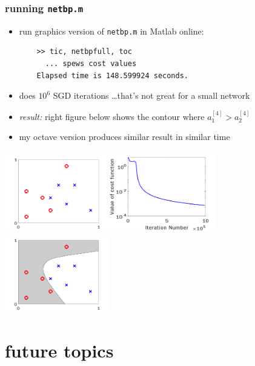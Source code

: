 \documentclass[xcolor={svgnames},
               hyperref={colorlinks,citecolor=DeepPink4,linkcolor=FireBrick,urlcolor=Maroon}]
               {beamer}
\begin{document}
\begin{frame}[fragile]
\frametitle{running \texttt{netbp.m}}

\begin{itemize}
\item run graphics version of \texttt{netbp.m} in Matlab online:

\begin{Verbatim}
    >> tic, netbpfull, toc
      ... spews cost values
    Elapsed time is 148.599924 seconds.
\end{Verbatim}

\item does $10^6$ SGD iterations \dots that's not great for a small network
\item \emph{result:} right figure below shows the contour where $a_1^{[4]} > a_2^{[4]}$
\item my octave version produces similar result in similar time
\end{itemize}

\bigskip
\mbox{\includegraphics[width=0.34\textwidth]{figs/fig1netbp}\includegraphics[width=0.35\textwidth]{figs/fig2netbp}\includegraphics[width=0.34\textwidth]{figs/fig3netbp}}
\end{frame}


\section{future topics}
\end{document}
